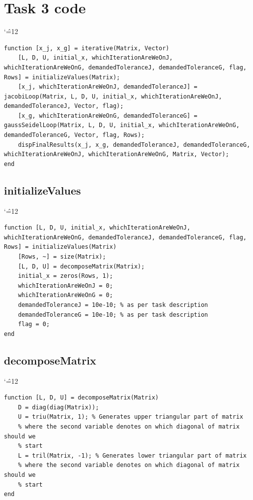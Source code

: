 \documentclass[12pt]{report}
\newenvironment{simplechar}{%
   \catcode`\^=12
}{}
\begin{document}
\section{Task 3 code}
\begin{simplechar}
\begin{lstlisting}
function [x_j, x_g] = iterative(Matrix, Vector)
    [L, D, U, initial_x, whichIterationAreWeOnJ, whichIterationAreWeOnG, demandedToleranceJ, demandedToleranceG, flag, Rows] = initializeValues(Matrix);
    [x_j, whichIterationAreWeOnJ, demandedToleranceJ] = jacobiLoop(Matrix, L, D, U, initial_x, whichIterationAreWeOnJ, demandedToleranceJ, Vector, flag);
    [x_g, whichIterationAreWeOnG, demandedToleranceG] = gaussSeidelLoop(Matrix, L, D, U, initial_x, whichIterationAreWeOnG, demandedToleranceG, Vector, flag, Rows);
    dispFinalResults(x_j, x_g, demandedToleranceJ, demandedToleranceG, whichIterationAreWeOnJ, whichIterationAreWeOnG, Matrix, Vector);
end

\end{lstlisting}
\end{simplechar}

\subsection{initializeValues}
\begin{simplechar}
\begin{lstlisting}
function [L, D, U, initial_x, whichIterationAreWeOnJ, whichIterationAreWeOnG, demandedToleranceJ, demandedToleranceG, flag, Rows] = initializeValues(Matrix)
    [Rows, ~] = size(Matrix);
    [L, D, U] = decomposeMatrix(Matrix);
    initial_x = zeros(Rows, 1);
    whichIterationAreWeOnJ = 0;
    whichIterationAreWeOnG = 0;
    demandedToleranceJ = 10e-10; % as per task description
    demandedToleranceG = 10e-10; % as per task description
    flag = 0;
end
\end{lstlisting}
\end{simplechar}

\subsection{decomposeMatrix}
\begin{simplechar}
\begin{lstlisting}
function [L, D, U] = decomposeMatrix(Matrix)
    D = diag(diag(Matrix));
    U = triu(Matrix, 1); % Generates upper triangular part of matrix
    % where the second variable denotes on which diagonal of matrix should we
    % start
    L = tril(Matrix, -1); % Generates lower triangular part of matrix
    % where the second variable denotes on which diagonal of matrix should we
    % start
end
\end{lstlisting}
\end{simplechar}
\end{document}
